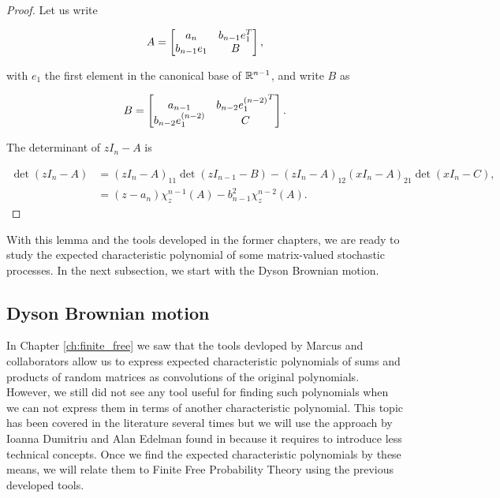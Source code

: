 \begin{proof}
    Let us write

    \begin{equation*}
        A = \begin{bmatrix}
            a_n   & b_{n-1} e_1^T \\
            b_{n-1}e_1 & B 
        \end{bmatrix},
    \end{equation*}

    \noindent with $e_1$ the first element in the canonical base of $\mathbb R^{n-1}$, and write $B$ as

    \begin{equation*}
        B = \begin{bmatrix}
            a_{n-1}   & b_{n-2} {e_1^{(n-2)}}^T \\
            b_{n-2} e_1^{(n-2)} & C 
        \end{bmatrix}.
    \end{equation*}

    The determinant of $zI_n - A$ is 

    \begin{align*}
        \det \left( zI_n - A \right) &= (zI_n - A)_{11}\det(zI_{n-1}-B) - (zI_n - A)_{12}(xI_n - A)_{21}\det(xI_n - C),\\ 
        &= (z - a_n)\chi^{n-1}_z(A) - b_{n-1}^2\chi^{n-2}_z(A).
    \end{align*}
\end{proof}

With this lemma and the tools developed in the former chapters, we are ready to study the expected characteristic polynomial of some matrix-valued stochastic processes. In the next subsection, we start with the Dyson Brownian motion.

\subsection{Dyson Brownian motion}

In Chapter \ref{ch:finite_free}  we saw that the tools devloped by Marcus and collaborators \cite{article:finitefree,article:arizmendi_perales,article:finitefree} allow us to express expected characteristic polynomials of sums and products of random matrices as convolutions of the original polynomials. However, we still did not see any tool useful for finding such polynomials when we can not express them in terms of another characteristic polynomial. This topic has been covered in the literature several times \cite{book:percy_deift_orthogonal,edelman1988eigenvalues,article:aomoto1987jacobi_selberg_integrals} but we will use the approach by Ioanna Dumitriu and Alan Edelman found in \cite{article:dumitriu_edelman} because it requires to introduce less technical concepts. Once we find the expected characteristic polynomials by these means, we will relate them to Finite Free Probability Theory using the previous developed tools.

